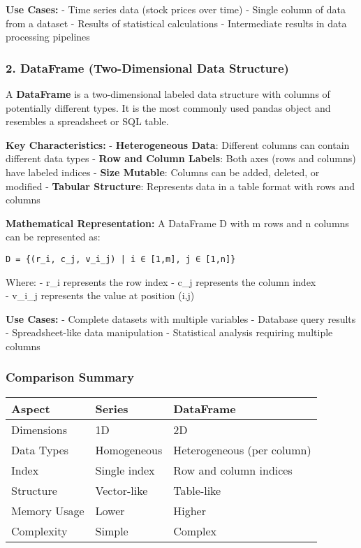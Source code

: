 \documentclass[11pt]{article}
\begin{document}
\textbf{Use Cases:} - Time series data (stock prices over time) - Single
column of data from a dataset - Results of statistical calculations -
Intermediate results in data processing pipelines

\subsubsection{2. DataFrame (Two-Dimensional Data
Structure)}\label{dataframe-two-dimensional-data-structure}

A \textbf{DataFrame} is a two-dimensional labeled data structure with
columns of potentially different types. It is the most commonly used
pandas object and resembles a spreadsheet or SQL table.

\textbf{Key Characteristics:} - \textbf{Heterogeneous Data}: Different
columns can contain different data types - \textbf{Row and Column
Labels}: Both axes (rows and columns) have labeled indices -
\textbf{Size Mutable}: Columns can be added, deleted, or modified -
\textbf{Tabular Structure}: Represents data in a table format with rows
and columns

\textbf{Mathematical Representation:} A DataFrame D with m rows and n
columns can be represented as:

\begin{verbatim}
D = {(r_i, c_j, v_i_j) | i ∈ [1,m], j ∈ [1,n]}
\end{verbatim}

Where: - r\_i represents the row index - c\_j represents the column
index\\
- v\_i\_j represents the value at position (i,j)

\textbf{Use Cases:} - Complete datasets with multiple variables -
Database query results - Spreadsheet-like data manipulation -
Statistical analysis requiring multiple columns

\subsubsection{Comparison Summary}\label{comparison-summary}

\begin{longtable}[]{@{}lll@{}}
\toprule\noalign{}
Aspect & Series & DataFrame \\
\midrule\noalign{}
\endhead
\bottomrule\noalign{}
\endlastfoot
Dimensions & 1D & 2D \\
Data Types & Homogeneous & Heterogeneous (per column) \\
Index & Single index & Row and column indices \\
Structure & Vector-like & Table-like \\
Memory Usage & Lower & Higher \\
Complexity & Simple & Complex \\
\end{longtable}
\end{document}
